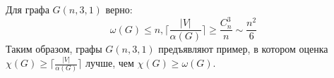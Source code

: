 \begin{corollary}
    Для графа \(G(n, 3, 1)\) верно: 
    \[\omega(G) \le n, \lceil\frac{|V|}{\alpha(G)}\rceil \ge \frac{C_n^3}{n} \sim \frac{n^2}{6}\]
    Таким образом, графы \(G(n, 3, 1)\) предъявляют пример, в котором оценка \(\chi(G) \ge \lceil\frac{|V|}{\alpha(G)}\rceil\) лучше, чем \(\chi(G) \ge \omega(G)\).
\end{corollary}
